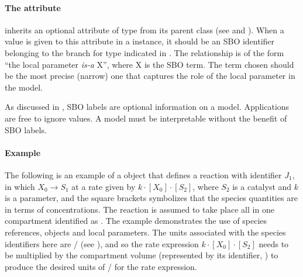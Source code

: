 \paragraph{The  attribute}

\LocalParameter inherits an optional  attribute of
type  from its parent class \SBase (see
 and ).  When a
value is given to this attribute in a \LocalParameter instance, it
should be an SBO identifier belonging to the branch for type
\LocalParameter indicated in .
The relationship is of the form ``the local parameter \emph{is-a}
X'', where X is the SBO term.  The term chosen should be the most
precise (narrow) one that captures the role of the local parameter
in the model.

As discussed in , SBO labels are optional
information on a model.  Applications are free to ignore
 values.  A model must be interpretable without the
benefit of SBO labels.


\paragraph{Example}

The following is an example of a \Reaction object that defines a
reaction with identifier $J_1$, in which $X_0 \rightarrow S_1$ at
a rate given by $k \cdot [X_0] \cdot [S_2]$, where $S_2$ is a
catalyst and $k$ is a parameter, and the square brackets
symbolizes that the species quantities are in terms of
concentrations.  The reaction is assumed to take place all in one
compartment identified as .  The example demonstrates the
use of species references, \KineticLaw objects and local
parameters.  The units associated with the species identifiers
here are / (see
), and so the rate expression $k \cdot
[X_0] \cdot [S_2]$ needs to be multiplied by the compartment
volume (represented by its identifier, ) to produce the
desired units of / for the rate
expression.

